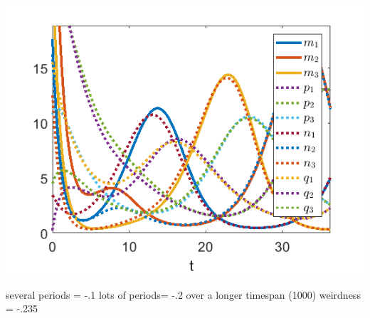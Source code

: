 \documentclass{article}
\begin{document}
\begin{center}
    \includegraphics[scale = .8]{part1_1_fig.png}
\end{center}
several periods = -.1   lots of periods= -.2 over a longer timespan (1000)
 weirdness = -.235  
\end{document}
